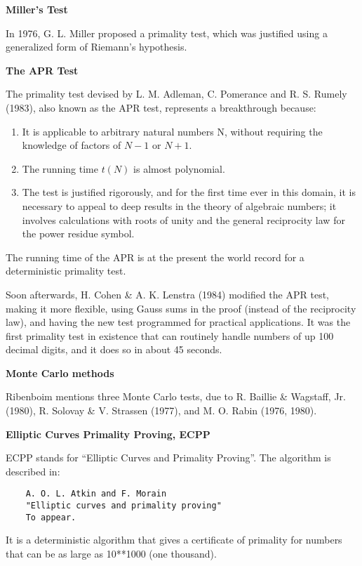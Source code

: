{\bf Miller's Test}

In 1976, G. L. Miller proposed a primality test, which was justified
using a generalized form of Riemann's hypothesis.

{\bf The APR Test}

The primality test devised by L. M. Adleman, C. Pomerance and R. S.
Rumely (1983), also known as the APR test, represents a breakthrough
because:

\begin{enumerate}
  \item It is applicable to arbitrary natural numbers N, without
  requiring the knowledge of factors of $N - 1$ or $N + 1$.
  \item The running time $t(N)$ is almost polynomial.
  \item The test is justified rigorously, and for the first time ever in
  this domain, it is necessary to appeal to deep results in the theory
  of algebraic numbers; it involves calculations with roots of unity and
  the general reciprocity law for the power residue symbol.
\end{enumerate}

The running time of the APR is at the present the world record for a
deterministic primality test.

Soon afterwards, H. Cohen \& A. K. Lenstra (1984) modified the APR test,
making it more flexible, using Gauss sums in the proof (instead of the
reciprocity law), and having the new test programmed for practical
applications. It was the first primality test in existence that can
routinely handle numbers of up 100 decimal digits, and it does so in
about 45 seconds.

{\bf Monte Carlo methods}

Ribenboim mentions three Monte Carlo tests, due to R. Baillie \&
Wagstaff, Jr. (1980), R. Solovay \& V. Strassen (1977), and M. O. Rabin
(1976, 1980).

{\bf Elliptic Curves Primality Proving, ECPP}

ECPP stands for ``Elliptic Curves and Primality Proving''. The algorithm
is described in:

\begin{verbatim}
    A. O. L. Atkin and F. Morain
    "Elliptic curves and primality proving"
    To appear.
\end{verbatim}

It is a deterministic algorithm that gives a certificate of primality
for numbers that can be as large as 10**1000 (one thousand).

